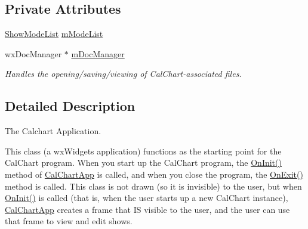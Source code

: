 \subsection*{Private Attributes}
\begin{DoxyCompactItemize}
\item 
\hyperlink{a00236_a39f2aa1ac0d2da59ef7f3e58b13f44d2}{Show\-Mode\-List} \hyperlink{a00019_a1b1b26f2dfd6c8c9b3b4197a76a5508f}{m\-Mode\-List}
\item 
wx\-Doc\-Manager $\ast$ \hyperlink{a00019_a57de14625ab8d1f57c4bdc02e0a9dd8b}{m\-Doc\-Manager}
\begin{DoxyCompactList}\small\item\em Handles the opening/saving/viewing of Cal\-Chart-\/associated files. \end{DoxyCompactList}\end{DoxyCompactItemize}


\subsection{Detailed Description}
The Calchart Application. 

This class (a wx\-Widgets application) functions as the starting point for the Cal\-Chart program. When you start up the Cal\-Chart program, the \hyperlink{a00019_a18be3b3d0fad5cca9d071c8db6d535cc}{On\-Init()} method of \hyperlink{a00019}{Cal\-Chart\-App} is called, and when you close the program, the \hyperlink{a00019_af5b65edc5a8a3d066f798406cb695a3e}{On\-Exit()} method is called. This class is not drawn (so it is invisible) to the user, but when \hyperlink{a00019_a18be3b3d0fad5cca9d071c8db6d535cc}{On\-Init()} is called (that is, when the user starts up a new Cal\-Chart instance), \hyperlink{a00019}{Cal\-Chart\-App} creates a frame that I\-S visible to the user, and the user can use that frame to view and edit shows. 

